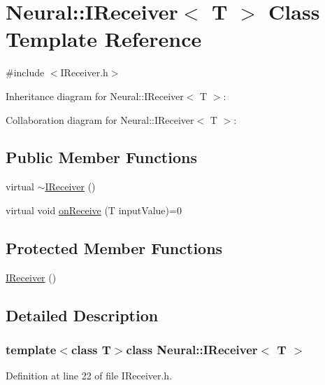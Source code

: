 \hypertarget{class_neural_1_1_i_receiver}{
\section{Neural::IReceiver$<$ T $>$ Class Template Reference}
\label{class_neural_1_1_i_receiver}
}


{\ttfamily \#include $<$IReceiver.h$>$}



Inheritance diagram for Neural::IReceiver$<$ T $>$:


Collaboration diagram for Neural::IReceiver$<$ T $>$:
\subsection*{Public Member Functions}
\begin{DoxyCompactItemize}
\item 
virtual \hyperlink{class_neural_1_1_i_receiver_afc551e0b202e0c3219b7a3b01028379e}{$\sim$IReceiver} ()
\item 
virtual void \hyperlink{class_neural_1_1_i_receiver_aa05f65f454efc76604a5e2c5644720fc}{onReceive} (T inputValue)=0
\end{DoxyCompactItemize}
\subsection*{Protected Member Functions}
\begin{DoxyCompactItemize}
\item 
\hyperlink{class_neural_1_1_i_receiver_a722411596d623767bf292f28a0b0c5e9}{IReceiver} ()
\end{DoxyCompactItemize}


\subsection{Detailed Description}
\subsubsection*{template$<$class T$>$class Neural::IReceiver$<$ T $>$}



Definition at line 22 of file IReceiver.h.



